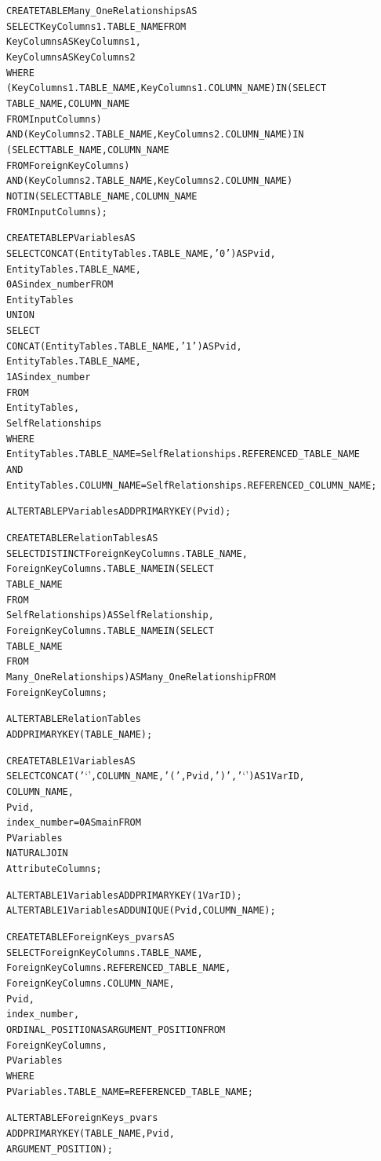 \begin{appendix}
\begin{scriptsize}
\begin{alltt}
CREATE TABLE Many_OneRelationships AS 
SELECT KeyColumns1.TABLE_NAME FROM
KeyColumns AS KeyColumns1,
KeyColumns AS KeyColumns2
WHERE
(KeyColumns1.TABLE_NAME , KeyColumns1.COLUMN_NAME) IN (SELECT 
        TABLE_NAME, COLUMN_NAME
    FROM         InputColumns)
    AND (KeyColumns2.TABLE_NAME , KeyColumns2.COLUMN_NAME) IN 
  (SELECT  TABLE_NAME, COLUMN_NAME
    FROM    ForeignKeyColumns)
    AND (KeyColumns2.TABLE_NAME , KeyColumns2.COLUMN_NAME)
   NOT IN (SELECT  TABLE_NAME, COLUMN_NAME
    FROM     InputColumns);

CREATE TABLE PVariables AS 
SELECT CONCAT(EntityTables.TABLE_NAME, '0') AS Pvid,
EntityTables.TABLE_NAME,
0 AS index_number FROM
EntityTables 
UNION 
SELECT 
CONCAT(EntityTables.TABLE_NAME, '1') AS Pvid,
EntityTables.TABLE_NAME,
1 AS index_number
FROM
EntityTables,
SelfRelationships
WHERE
EntityTables.TABLE_NAME = SelfRelationships.REFERENCED_TABLE_NAME
AND 
EntityTables.COLUMN_NAME = SelfRelationships.REFERENCED_COLUMN_NAME;

ALTER TABLE PVariables ADD PRIMARY KEY (Pvid);

CREATE TABLE RelationTables AS 
SELECT DISTINCT ForeignKeyColumns.TABLE_NAME,
ForeignKeyColumns.TABLE_NAME IN (SELECT 
        TABLE_NAME
    FROM
        SelfRelationships) AS SelfRelationship,
ForeignKeyColumns.TABLE_NAME IN (SELECT 
        TABLE_NAME
    FROM
        Many_OneRelationships) AS Many_OneRelationship FROM
ForeignKeyColumns;

ALTER TABLE RelationTables 
ADD PRIMARY KEY (TABLE_NAME);

CREATE TABLE 1Variables AS 
SELECT CONCAT('`', COLUMN_NAME, '(', Pvid, ')', '`') AS 1VarID,
COLUMN_NAME,
Pvid,
index_number = 0 AS main FROM
PVariables
    NATURAL JOIN
AttributeColumns;

ALTER TABLE 1Variables ADD PRIMARY KEY (1VarID);
ALTER TABLE 1Variables ADD UNIQUE(Pvid,COLUMN_NAME);

CREATE TABLE ForeignKeys_pvars AS 
SELECT ForeignKeyColumns.TABLE_NAME,
ForeignKeyColumns.REFERENCED_TABLE_NAME,
ForeignKeyColumns.COLUMN_NAME,
Pvid,
index_number,
ORDINAL_POSITION AS ARGUMENT_POSITION FROM
ForeignKeyColumns,
PVariables
WHERE
PVariables.TABLE_NAME = REFERENCED_TABLE_NAME;

ALTER TABLE ForeignKeys_pvars 
ADD PRIMARY KEY (TABLE_NAME,Pvid,
ARGUMENT_POSITION);


\end{alltt}
\end{scriptsize}
\end{appendix}
